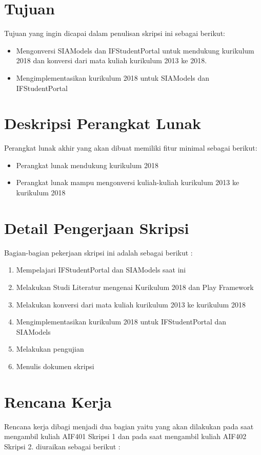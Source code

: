 \documentclass[a4paper,twoside]{article}
\begin{document}
\section{Tujuan}
Tujuan yang ingin dicapai dalam penulisan skripsi ini sebagai berikut:
\begin{itemize}
	\item Mengonversi SIAModels dan IFStudentPortal untuk mendukung kurikulum 2018 dan konversi dari mata kuliah kurikulum 2013 ke 2018.
	\item Mengimplementasikan kurikulum 2018 untuk SIAModels dan IFStudentPortal
\end{itemize}

\section{Deskripsi Perangkat Lunak}
Perangkat lunak akhir yang akan dibuat memiliki fitur minimal sebagai berikut:
\begin{itemize}
	\item Perangkat lunak mendukung kurikulum 2018
	\item Perangkat lunak mampu mengonversi kuliah-kuliah kurikulum 2013 ke kurikulum 2018
\end{itemize}

\section{Detail Pengerjaan Skripsi}
Bagian-bagian pekerjaan skripsi ini adalah sebagai berikut :
	\begin{enumerate}
		\item Mempelajari IFStudentPortal dan SIAModels saat ini
		\item Melakukan Studi Literatur mengenai Kurikulum 2018 dan Play Framework
		\item Melakukan konversi dari mata kuliah kurikulum 2013 ke kurikulum 2018 
		\item Mengimplementasikan kurikulum 2018 untuk IFStudentPortal dan SIAModels
		\item Melakukan pengujian
		\item Menulis dokumen skripsi
	\end{enumerate}

\section{Rencana Kerja}
Rencana kerja dibagi menjadi dua bagian yaitu yang akan dilakukan pada saat mengambil kuliah AIF401 Skripsi 1 dan pada saat mengambil kuliah AIF402 Skripsi 2. diuraikan sebagai berikut :
\end{document}
